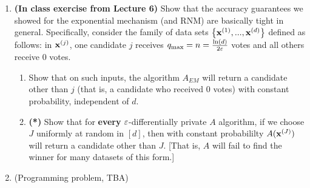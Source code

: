 \documentclass[11pt]{article}
\begin{document}
\begin{enumerate}[leftmargin=\parindent, itemsep=3ex]
    \item \textbf{(In class exercise from Lecture 6)} Show that the accuracy guarantees we showed for the
        exponential mechanism (and RNM) are basically tight in
        general. Specifically, consider the family of data sets
        $\left\{ {\mathbf{x}}^{(1)},...,{\mathbf{x}}^{(d)} \right\}$ defined as follows: in
            ${\mathbf{x}}^{(j)}$, one candidate $j$
        receives ${q_{\max}} = n = \frac{\ln(d)}{2\varepsilon}$  votes and all others
        receive 0 votes.
        \begin{enumerate}
        \item Show that on such inputs, the
        algorithm $A_{EM}$ will return a candidate other than $j$ (that is, a candidate 
        who received 0 votes)
        with constant probability, independent of $d$.
        \item \textbf{(*)}  Show that for \textbf{every}
        $\varepsilon$-differentially private $A$
        algorithm, if we choose $J$ uniformly at random in $[d]$, then
        with constant probabililty $A({\mathbf{x}}^{(J)})$ will return a candidate
        other than $J$. [That is, $A$ will fail to find the winner for
        many datasets of this form.]
        \end{enumerate}

    \item (Programming problem, TBA)



        

  
  \end{enumerate}
\end{document}
